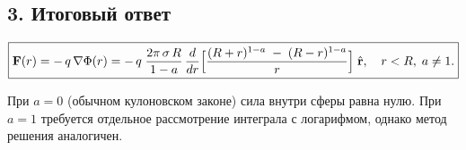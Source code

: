 \documentclass{article}
\begin{document}
\subsection*{3. Итоговый ответ}

\[
\boxed{
\mathbf{F}(r)
=
-\,q\,\nabla \Phi(r)
=
-\,q\;\frac{2\pi\,\sigma\,R}{\,1-a\,}\,
\frac{d}{dr}
\Bigl[
\frac{(R+r)^{1-a} \;-\; (R-r)^{1-a}}{\,r\,}
\Bigr]\;\hat{\mathbf{r}},
\quad r<R,\;a\neq1.
}
\]

\noindent
При $a=0$ (обычном кулоновском законе) сила внутри сферы равна нулю. При $a=1$ требуется отдельное рассмотрение интеграла с логарифмом, однако метод решения аналогичен.
\end{document}
